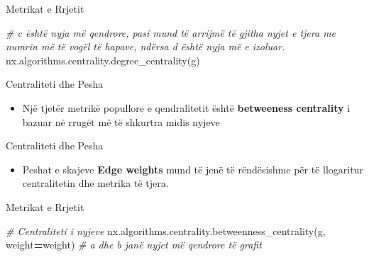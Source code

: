 \documentclass[
  ignorenonframetext,
]{beamer}
\newenvironment{Shaded}{\begin{snugshade}}{\end{snugshade}}
\newcommand{\CommentTok}[1]{\textcolor[rgb]{0.56,0.35,0.01}{\textit{#1}}}
\newcommand{\NormalTok}[1]{#1}
\newcommand{\OperatorTok}[1]{\textcolor[rgb]{0.81,0.36,0.00}{\textbf{#1}}}
\newcommand{\StringTok}[1]{\textcolor[rgb]{0.31,0.60,0.02}{#1}}
\providecommand{\tightlist}{%
  \setlength{\itemsep}{0pt}\setlength{\parskip}{0pt}}
\begin{document}
\begin{frame}[fragile]{Metrikat e Rrjetit}
\protect\hypertarget{metrikat-e-rrjetit-6}{}

\begin{Shaded}
\begin{Highlighting}[]
\CommentTok{\# \textquotesingle{}c\textquotesingle{} është nyja më qendrore, pasi mund të arrijmë të gjitha nyjet e tjera me numrin më të vogël të hapave, ndërsa \textquotesingle{}d\textquotesingle{} është nyja më e izoluar.}
\NormalTok{nx.algorithms.centrality.degree\_centrality(g)}
\end{Highlighting}
\end{Shaded}
\end{frame}

\begin{frame}{Centraliteti dhe Pesha}
\protect\hypertarget{centraliteti-dhe-pesha}{}
\begin{itemize}
\tightlist
\item
  Një tjetër metrikë popullore e qendralitetit është \textbf{betweeness
  centrality} i bazuar në rrugët më të shkurtra midis nyjeve
\end{itemize}
\end{frame}

\begin{frame}{Centraliteti dhe Pesha}
\protect\hypertarget{centraliteti-dhe-pesha-1}{}
\begin{itemize}
\tightlist
\item
  Peshat e skajeve \textbf{Edge weights} mund të jenë të rëndësishme për
  të llogaritur centralitetin dhe metrika të tjera.
\end{itemize}
\end{frame}

\begin{frame}[fragile]{Metrikat e Rrjetit}
\protect\hypertarget{metrikat-e-rrjetit-7}{}

\begin{Shaded}
\begin{Highlighting}[]
\CommentTok{\# Centraliteti i nyjeve}
\NormalTok{nx.algorithms.centrality.betweenness\_centrality(g, weight}\OperatorTok{=}\StringTok{\textquotesingle{}weight\textquotesingle{}}\NormalTok{)}
\CommentTok{\# \textquotesingle{}a\textquotesingle{} dhe \textquotesingle{}b\textquotesingle{} janë nyjet më qendrore të grafit}
\end{Highlighting}
\end{Shaded}
\end{frame}
\end{document}
